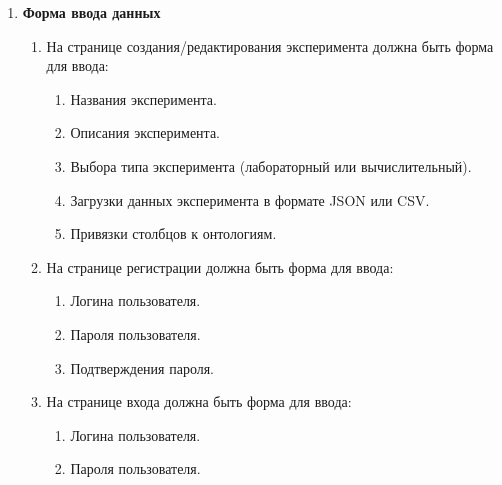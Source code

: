 \documentclass[a4paper,12pt,reqno]{article}
\begin{document}
\begin{enumerate}
        \item \textbf{Форма ввода данных}
        \begin{enumerate}[label=\arabic{enumi}.\arabic*.]
            \item На странице создания/редактирования эксперимента должна быть форма для ввода:
            \begin{enumerate}[label=\arabic{enumi}.\arabic{enumii}.\arabic*.]
                \item Названия эксперимента.
                \item Описания эксперимента.
                \item Выбора типа эксперимента (лабораторный или вычислительный).
                \item Загрузки данных эксперимента в формате JSON или CSV.
                \item Привязки столбцов к онтологиям.
            \end{enumerate}
            \item На странице регистрации должна быть форма для ввода:
            \begin{enumerate}[label=\arabic{enumi}.\arabic{enumii}.\arabic*.]
                \item Логина пользователя.
                \item Пароля пользователя.
                \item Подтверждения пароля.
            \end{enumerate}
            \item На странице входа должна быть форма для ввода:
            \begin{enumerate}[label=\arabic{enumi}.\arabic{enumii}.\arabic*.]
                \item Логина пользователя.
                \item Пароля пользователя.
            \end{enumerate}
        \end{enumerate}


\end{enumerate}
\end{document}
